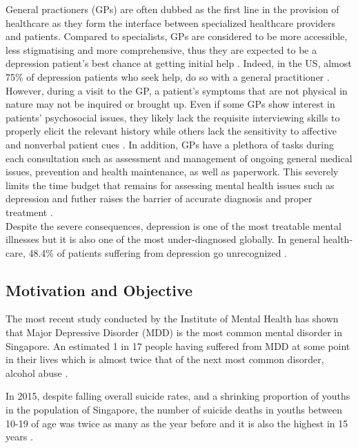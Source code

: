 \documentclass{article}
\begin{document}
	General practioners (GPs) are often dubbed as the first line in the provision of healthcare as they form the interface between specialized healthcare providers and patients. Compared to specialists, GPs are considered to be more accessible, less stigmatising and more comprehensive, thus they are expected to be a depression patient's best chance at getting initial help \cite{rothman2003}. Indeed, in the US, almost 75\% of depression patients who seek help, do so with a general practitioner \cite{goldman1999}. \\ 

	However, during a visit to the GP, a patient's symptoms that are not physical in nature may not be inquired or brought up. Even if some GPs show interest in patients' psychosocial issues, they likely lack the requisite interviewing skills to properly elicit the relevant history while others lack the sensitivity to affective and nonverbal patient cues \cite{badger1994}. In addition, GPs have a plethora of tasks during each consultation such as assessment and management of ongoing general medical issues, prevention and health maintenance, as well as paperwork. This severely limits the time budget that remains for assessing mental health issues such as depression and futher raises the barrier of accurate diagnosis and proper treatment \cite{telford2002}. \\

	Despite the severe consequences, depression is one of the most treatable mental illnesses but it is also one of the most under-diagnosed globally. 
	In general health-care, 48.4\% of patients suffering from depression go unrecognized \cite{jama2003}.

	\subsection{Motivation and Objective}
	The most recent study conducted by the Institute of Mental Health has shown that Major Depressive Disorder (MDD) is the most common mental disorder in Singapore. An estimated 1 in 17 people having suffered from MDD at some point in their lives which is almost twice that of the next most common disorder, alcohol abuse \cite{annacadmedsg}.

	In 2015, despite falling overall suicide rates, and a shrinking proportion of youths in the population of Singapore, the number of suicide deaths in youths between 10-19 of age was twice as many as the year before and it is also the highest in 15 years \cite{samaritansofsingapore2016}.
	
\end{document}
